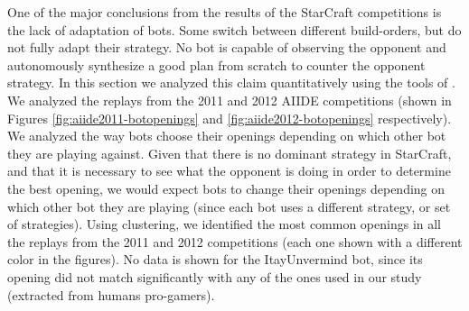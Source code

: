 \documentclass[journal]{IEEEtran}
\begin{document}
One of the major conclusions from the results of the StarCraft competitions is the lack of adaptation of bots.  Some switch between different build-orders, but do not fully adapt their strategy. No bot is capable of observing the opponent and autonomously synthesize a good plan from scratch to counter the opponent strategy. In this section we analyzed this claim quantitatively using the tools of \cite{SynnaeveOpeningCig11}. We analyzed the replays from the 2011 and 2012 AIIDE competitions (shown in Figures \ref{fig:aiide2011-botopenings} and \ref{fig:aiide2012-botopenings} respectively). We analyzed the way bots choose their openings depending on which other bot they are playing against. Given that there is no dominant strategy in StarCraft, and that it is necessary to see what the opponent is doing in order to determine the best opening, we would expect bots to change their openings depending on which other bot they are playing (since each bot uses a different strategy, or set of strategies). Using clustering, we identified the most common openings in all the replays from the 2011 and 2012 competitions (each one shown with a different color in the figures). No data is shown for the ItayUnvermind bot, since its opening did not match significantly with any of the ones used in our study (extracted from humans pro-gamers).
\end{document}
